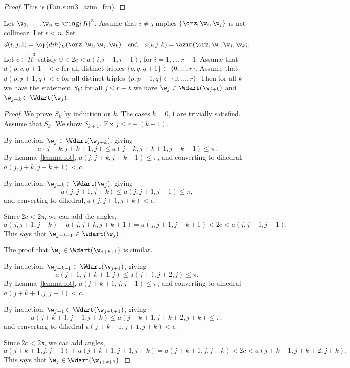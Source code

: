 \begin{proof} This is (Fan.sum3\_azim\_fan).
\end{proof}

\begin{lemma} \label{lemma:deform-wedge} 
Let $\w_0,\ldots,\w_{n}\in \ring{R}^3$.  Assume that $i\ne j$ implies
$\{\orz,\w_i,\w_j\}$ is not collinear.   Let $r<n$.
Set
\[
d(i,j,k)=\op{dih}_V(\orz,\w_i,\w_j,\w_k) \quad\text{and}\quad a(i,j,k) = \azim(\orz,\w_i,\w_j,\w_k).
\]
Let $c\in\ring{R}^3$ satisfy $0 < 2 c < a(i,i+1,i-1)$, for $i=1,\ldots,r-1$.
Assume that $d(p,q,q+1)<c$ for all distinct triples $\{p,q,q+1\}\subset \{0,\ldots,r\}$.
Assume that $d(p,p+1,q)<c$ for all distinct triples $\{p,p+1,q\}\subset \{0,\ldots,r\}$.
Then for all $k$ we have the statement $S_k$: 
for all $j\le r - k$ we have $\w_j\in \Wdart(\w_{j+k})$ and $\w_{j+k}\in \Wdart(\w_j)$.
\end{lemma}

\begin{proof} We prove $S_k$ by induction on $k$.  The cases $k=0,1$ are trivially satisfied.
Assume that $S_k$.  We show $S_{k+1}$.  Fix $j\le r-(k+1)$.

By induction, $\w_j\in \Wdart(\w_{j+k})$, giving
\[
a(j+k,j+k+1,j)\le a(j+k,j+k+1,j+k-1)\le\pi.
\]
By Lemma~\ref{lemma:rot}, $a(j,j+k,j+k+1)\le\pi$, and converting to dihedral, $a(j,j+k,j+k+1)< c$.

By induction, $\w_{j+k}\in \Wdart(\w_j)$, giving
\[
a(j,j+1,j+k)\le a(j,j+1,j-1)\le \pi,
\]
and converting to dihedral, $a(j,j+1,j+k)<c$.

Since $2c < 2\pi$, we can add the angles,
\[
a(j,j+1,j+k) + a(j,j+k,j+k+1) = a(j,j+1,j+k+1) < 2c < a(j,j+1,j-1).
\]
This says that $\w_{j+k+1}\in \Wdart(\w_j)$.

The proof that $\w_j\in \Wdart(\w_{j+k+1})$ is similar.

By induction, $\w_{j+k+1}\in \Wdart(\w_{j+1})$, giving
\[
a(j+1,j+k+1,j)\le a(j+1,j+2,j)\le \pi.
\]
By Lemma~\ref{lemma:rot}, $a(j+k+1,j,j+1)\le \pi$, and converting to dihedral $a(j+k+1,j,j+1)<c$.

By induction, $\w_{j+1}\in \Wdart(\w_{j+k+1})$, giving
\[
a(j+k+1,j+1,j+k)\le a (j+k+1,j+k+2,j+k)\le \pi,
\]
and converting to dihedral $a(j+k+1,j+1,j+k) < c$.

Since $2c < 2\pi$, we can add angles,
\[
a(j+k+1,j,j+1) + a(j+k+1,j+1,j+k) = a(j+k+1,j,j+k) < 2 c < a(j+k+1,j+k+2,j+k).
\]
This says that $\w_{j}\in \Wdart(\w_{j+k+1})$.
\end{proof}

